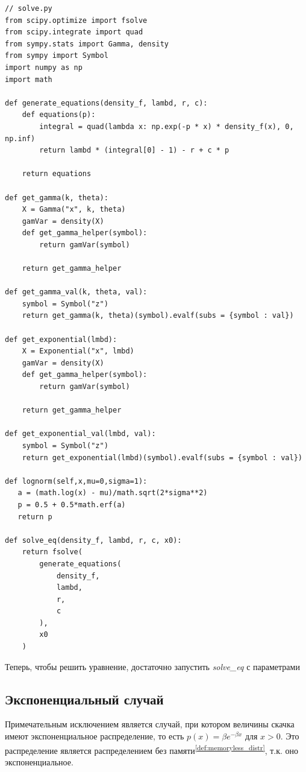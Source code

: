 \documentclass[a4paper,12pt]{article}
\theoremstyle{definition}
\begin{document}
\begin{lstlisting}
// solve.py
from scipy.optimize import fsolve
from scipy.integrate import quad
from sympy.stats import Gamma, density
from sympy import Symbol
import numpy as np
import math

def generate_equations(density_f, lambd, r, c):
    def equations(p):
        integral = quad(lambda x: np.exp(-p * x) * density_f(x), 0, np.inf)
        return lambd * (integral[0] - 1) - r + c * p

    return equations

def get_gamma(k, theta):
    X = Gamma("x", k, theta)
    gamVar = density(X)
    def get_gamma_helper(symbol):
        return gamVar(symbol)
    
    return get_gamma_helper

def get_gamma_val(k, theta, val):
    symbol = Symbol("z")
    return get_gamma(k, theta)(symbol).evalf(subs = {symbol : val})
    
def get_exponential(lmbd):
    X = Exponential("x", lmbd)
    gamVar = density(X)
    def get_gamma_helper(symbol):
        return gamVar(symbol)
    
    return get_gamma_helper

def get_exponential_val(lmbd, val):
    symbol = Symbol("z")
    return get_exponential(lmbd)(symbol).evalf(subs = {symbol : val})
    
def lognorm(self,x,mu=0,sigma=1):
   a = (math.log(x) - mu)/math.sqrt(2*sigma**2)
   p = 0.5 + 0.5*math.erf(a)
   return p
   
def solve_eq(density_f, lambd, r, c, x0):
    return fsolve(
        generate_equations(
            density_f,
            lambd,
            r,
            c
        ),
        x0
    )
\end{lstlisting}

Теперь, чтобы решить уравнение, достаточно запустить \textit{solve\_eq} с параметрами


\subsection{Экспоненциальный случай}

Примечательным исключением является случай, при котором величины скачка имеют экспоненциальное распределение, то есть $p(x) = \beta e^{-\beta x}$ для $x > 0$. Это распределение является распределением без памяти\textsuperscript{{\ref{def:memoryless_distr}}}, т.к. оно экспоненциальное.
\end{document}
